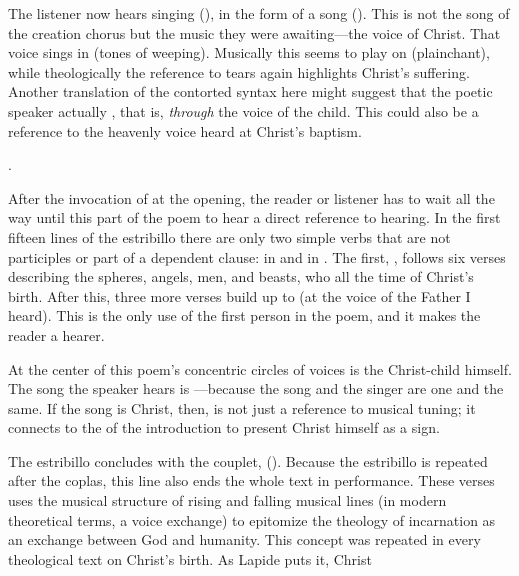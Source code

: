 
The listener now hears singing (), in the form of a song
().  
This is not the song of the creation chorus but the music they were
awaiting---the voice of Christ.
That voice sings in  (tones of weeping).
Musically this seems to play on  (plainchant), while
theologically the reference to tears again highlights Christ's suffering.
Another translation of the contorted syntax here might suggest that the poetic
speaker actually , that is,
\emph{through} the voice of the child.
This could also be a reference to the heavenly voice heard at Christ's baptism.%
\begin{Footnote} 
    .
\end{Footnote}

After the invocation of  at the opening, the reader or listener
has to wait all the way until this part of the poem to hear a direct reference
to hearing.
In the first fifteen lines of the estribillo there are only two simple verbs
that are not participles or part of a dependent clause:  in
 and  in .
The first, , follows six verses describing the spheres, angels,
men, and beasts, who all  the time of Christ's birth.
After this, three more verses build up to  (at the
voice of the Father I heard).
This is the only use of the first person in the poem, and it makes the reader a
hearer.

At the center of this poem's concentric circles of voices is the Christ-child
himself.
The song the speaker hears is ---because the song and the singer are one and the same.
If the song is Christ, then,  is not
just a reference to musical tuning; it connects to the  of the
introduction to present Christ himself as a sign.

The estribillo concludes with the couplet,  ().
Because the estribillo is repeated after the coplas, this line also ends the
whole text in performance.
These verses uses the musical structure of rising and falling musical lines (in
modern theoretical terms, a voice exchange) to epitomize the theology of
incarnation as an exchange between God and humanity.
This concept was repeated in every theological text on Christ's birth.
As Lapide puts it, Christ %
    \Autocite
    [670, on ; the quotation from Anselm is .]
    {Lapide:Gospels19C}

